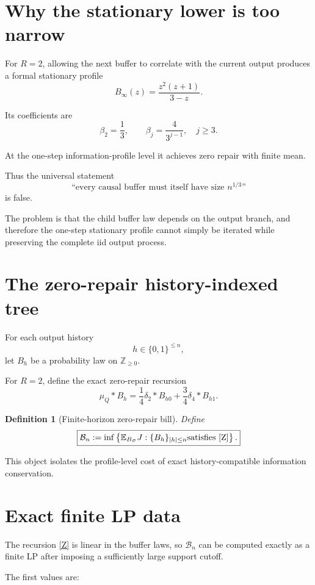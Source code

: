 \documentclass[11pt,a4paper]{article}
\newtheorem{definition}[theorem]{Definition}
\newcommand{\E}{\mathbb E}
\newcommand{\cB}{\mathcal B}
\newcommand{\bits}{\{0,1\}}
\newcommand{\Z}{\mathbb Z}
\begin{document}
\section{Why the stationary lower is too narrow}

For \(R=2\), allowing the next buffer to correlate with the current output
produces a formal stationary profile
\[
\boxed{
B_\infty(z)
=
\frac{z^2(z+1)}{3-z}.
}
\]

Its coefficients are
\[
\beta_2=\frac13,
\qquad
\beta_j=\frac4{3^{j-1}},
\quad j\ge3.
\]

At the one-step information-profile level it achieves zero repair with
finite mean.

Thus the universal statement
\[
\text{``every causal buffer must itself have size }n^{1/3}\text{''}
\]
is false.

The problem is that the child buffer law depends on the output branch, and
therefore the one-step stationary profile cannot simply be iterated while
preserving the complete iid output process.

\section{The zero-repair history-indexed tree}

For each output history
\[
h\in\bits^{\le n},
\]
let \(B_h\) be a probability law on \(\Z_{\ge0}\).

For \(R=2\), define the exact zero-repair recursion
\[
\boxed{
\mu_Q*B_h
=
\frac14\delta_2*B_{h0}
+
\frac34\delta_4*B_{h1}.
}
\tag{Z}
\]

\begin{definition}[Finite-horizon zero-repair bill]
Define
\[
\boxed{
\cB_n
:=
\inf
\left\{
\E_{B_\varnothing}J:
\{B_h\}_{|h|\le n}
\text{satisfies \eqref{Z}}
\right\}.
}
\]
\end{definition}

This object isolates the profile-level cost of exact history-compatible
information conservation.

\section{Exact finite LP data}

The recursion \eqref{Z} is linear in the buffer laws, so \(\cB_n\) can be
computed exactly as a finite LP after imposing a sufficiently large support
cutoff.

The first values are:
\end{document}
